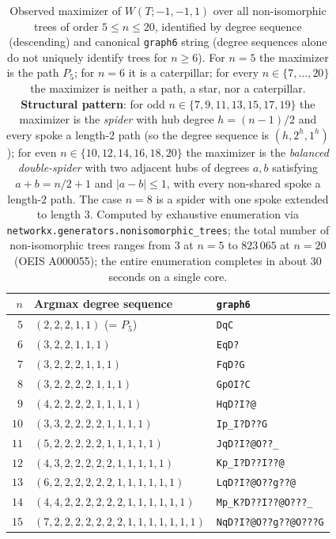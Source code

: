 \documentclass[11pt,a4paper]{article}
\theoremstyle{definition}
\begin{document}
\begin{table}[h]
\centering
\small
\caption{Observed maximizer of $W(T; -1, -1, 1)$ over all non-isomorphic trees of order $5 \le n \le 20$, identified by degree sequence (descending) and canonical \texttt{graph6} string (degree sequences alone do not uniquely identify trees for $n \ge 6$). For $n = 5$ the maximizer is the path $P_5$; for $n = 6$ it is a caterpillar; for every $n \in \{7, \ldots, 20\}$ the maximizer is neither a path, a star, nor a caterpillar. \textbf{Structural pattern}: for odd $n \in \{7, 9, 11, 13, 15, 17, 19\}$ the maximizer is the \emph{spider} with hub degree $h = (n-1)/2$ and every spoke a length-$2$ path (so the degree sequence is $(h, 2^h, 1^h)$); for even $n \in \{10, 12, 14, 16, 18, 20\}$ the maximizer is the \emph{balanced double-spider} with two adjacent hubs of degrees $a, b$ satisfying $a + b = n/2 + 1$ and $|a - b| \le 1$, with every non-shared spoke a length-$2$ path. The case $n = 8$ is a spider with one spoke extended to length $3$. Computed by exhaustive enumeration via \texttt{networkx.generators.nonisomorphic\_trees}; the total number of non-isomorphic trees ranges from $3$ at $n = 5$ to $823\,065$ at $n = 20$ (OEIS A000055); the entire enumeration completes in about $30$ seconds on a single core.}
\label{tab:caterpillar_argmax}
\begin{tabular}{rll}
\toprule
$n$ & Argmax degree sequence & \texttt{graph6}\\
\midrule
$5$  & $(2, 2, 2, 1, 1)$ \quad (= $P_5$) & \texttt{DqC}\\
$6$  & $(3, 2, 2, 1, 1, 1)$ & \texttt{EqD?}\\
$7$  & $(3, 2, 2, 2, 1, 1, 1)$ & \texttt{FqD?G}\\
$8$  & $(3, 2, 2, 2, 2, 1, 1, 1)$ & \texttt{GpOI?C}\\
$9$  & $(4, 2, 2, 2, 2, 1, 1, 1, 1)$ & \texttt{HqD?I?@}\\
$10$ & $(3, 3, 2, 2, 2, 2, 1, 1, 1, 1)$ & \texttt{Ip\_I?D??G}\\
$11$ & $(5, 2, 2, 2, 2, 2, 1, 1, 1, 1, 1)$ & \texttt{JqD?I?@O??\_}\\
$12$ & $(4, 3, 2, 2, 2, 2, 2, 1, 1, 1, 1, 1)$ & \texttt{Kp\_I?D??I??@}\\
$13$ & $(6, 2, 2, 2, 2, 2, 2, 1, 1, 1, 1, 1, 1)$ & \texttt{LqD?I?@O??g??@}\\
$14$ & $(4, 4, 2, 2, 2, 2, 2, 2, 1, 1, 1, 1, 1, 1)$ & \texttt{Mp\_K?D??I??@O???\_}\\
$15$ & $(7, 2, 2, 2, 2, 2, 2, 2, 1, 1, 1, 1, 1, 1, 1)$ & \texttt{NqD?I?@O??g??@O???G}\\

\end{tabular}
\end{table}
\end{document}
